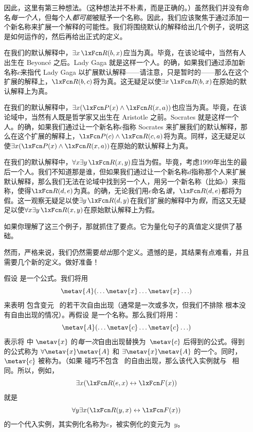 因此，这里有第三种想法。（这种想法并不朴素，而是正确的。）虽然我们并没有命名\emph{每一个人}，但每个人\emph{都可能}被赋予一个名称。因此，我们应该聚焦于通过添加一个新名称来扩展一个解释的可能性。我们将围绕默认的解释给出几个例子，说明这是如何运作的，然后再给出正式的定义。

在我们的默认解释中，$\exists x\, \atom{R}{b,x}$应当为真。毕竟，在该论域中，当然有人出生在 Beyonc\'e 之后。Lady Gaga 就是这样一个人。的确，如果我们通过添加新名称$c$来指代 Lady Gaga 以扩展默认解释——请注意，只是暂时的——那么在这个扩展的解释上，$\atom{R}{b,c}$将为真。这无疑足以使$\exists x\, \atom{R}{b,x}$在原始的默认解释上为真。

在我们的默认解释中，$\exists x (\atom{P}{x} \eand \atom{R}{x,a})$也应当为真。毕竟，在该论域中，当然有人既是哲学家又出生在 Aristotle 之前。Socrates 就是这样一个人。的确，如果我们通过让一个新名称$c$指称 Socrates 来扩展我们的默认解释，那么在这个扩展的解释上，$\atom{P}{c} \eand \atom{R}{c,a}$将为真。同样，这无疑足以使$\exists x (\atom{P}{x} \eand \atom{R}{x,a})$在原始的默认解释上为真。

在我们的默认解释中，$\forall x \exists y\, \atom{R}{x,y}$应当为假。毕竟，考虑1999年出生的最后一个人。我们不知道那是谁，但如果我们通过让一个新名称$d$指称那个人来扩展默认解释，那么我们无法在论域中找到另一个人，用另一个新名称（比如$e$）来指称，使得$\atom{R}{d,e}$为真。的确，无论我们用$e$命名\emph{谁}，$\atom{R}{d,e}$都将为假。这一观察无疑足以使$\exists y\, \atom{R}{d,y}$在我们扩展的解释中为\emph{假}，而这又无疑足以使$\forall x \exists y\, \atom{R}{x,y}$在原始默认解释上为假。

如果你理解了这三个例子，那就抓住了要点。它为量化句子的真值定义提供了基础。

然而，严格来说，我们仍然需要\emph{给出}那个定义。遗憾的是，其结果有点难看，并且需要几个新的定义。做好准备！

假设  是一个公式。我们将用
$$\metav{A}(\ldots \metav{x} \ldots \metav{x} \ldots)$$ 来表明
 包含变元~ 的若干次自由出现（通常是一次或多次，但我们不排除  根本没有自由出现的情况）。再假设  是一个名称。那么我们将用：
$$\metav{A}(\ldots \metav{c} \ldots \metav{c} \ldots)$$
表示将  中 $\metav{x}$ 的\emph{每一次}自由出现替换为~$\metav{c}$ 后得到的公式。得到的公式称为 $\forall \metav{x}\metav{A}$ 和 $\exists\metav{x}\metav{A}$ 的一个。同时，$\metav{c}$ 被称为。（如果  碰巧不包含~ 的自由出现，那么该代入实例就与~ 相同。所以，例如，
	$$\exists x (\atom{R}{e,x} \eiff \atom{F}{x})$$
就是
	$$\forall y \exists x (\atom{R}{y,x} \eiff \atom{F}{x})$$
的一个代入实例，其实例化名称为$e$，被实例化的变元为~$y$。

